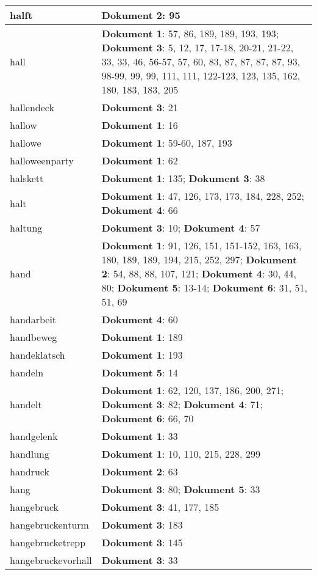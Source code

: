 \documentclass[a5paper]{article}
\begin{document}
\begin{longtable}[l]{|l|p{3in}|}
\hline
halft & \textbf{Dokument 2}: 95 \\
\hline
hall & \textbf{Dokument 1}: 57, 86, 189, 189, 193, 193; \textbf{Dokument 3}: 5, 12, 17, 17-18, 20-21, 21-22, 33, 33, 46, 56-57, 57, 60, 83, 87, 87, 87, 87, 93, 98-99, 99, 99, 111, 111, 122-123, 123, 135, 162, 180, 183, 183, 205 \\
\hline
hallendeck & \textbf{Dokument 3}: 21 \\
\hline
hallow & \textbf{Dokument 1}: 16 \\
\hline
hallowe & \textbf{Dokument 1}: 59-60, 187, 193 \\
\hline
halloweenparty & \textbf{Dokument 1}: 62 \\
\hline
halskett & \textbf{Dokument 1}: 135; \textbf{Dokument 3}: 38 \\
\hline
halt & \textbf{Dokument 1}: 47, 126, 173, 173, 184, 228, 252; \textbf{Dokument 4}: 66 \\
\hline
haltung & \textbf{Dokument 3}: 10; \textbf{Dokument 4}: 57 \\
\hline
hand & \textbf{Dokument 1}: 91, 126, 151, 151-152, 163, 163, 180, 189, 189, 194, 215, 252, 297; \textbf{Dokument 2}: 54, 88, 88, 107, 121; \textbf{Dokument 4}: 30, 44, 80; \textbf{Dokument 5}: 13-14; \textbf{Dokument 6}: 31, 51, 51, 69 \\
\hline
handarbeit & \textbf{Dokument 4}: 60 \\
\hline
handbeweg & \textbf{Dokument 1}: 189 \\
\hline
handeklatsch & \textbf{Dokument 1}: 193 \\
\hline
handeln & \textbf{Dokument 5}: 14 \\
\hline
handelt & \textbf{Dokument 1}: 62, 120, 137, 186, 200, 271; \textbf{Dokument 3}: 82; \textbf{Dokument 4}: 71; \textbf{Dokument 6}: 66, 70 \\
\hline
handgelenk & \textbf{Dokument 1}: 33 \\
\hline
handlung & \textbf{Dokument 1}: 10, 110, 215, 228, 299 \\
\hline
handruck & \textbf{Dokument 2}: 63 \\
\hline
hang & \textbf{Dokument 3}: 80; \textbf{Dokument 5}: 33 \\
\hline
hangebruck & \textbf{Dokument 3}: 41, 177, 185 \\
\hline
hangebruckenturm & \textbf{Dokument 3}: 183 \\
\hline
hangebrucketrepp & \textbf{Dokument 3}: 145 \\
\hline
hangebruckevorhall & \textbf{Dokument 3}: 33 \\

\end{longtable}
\end{document}

